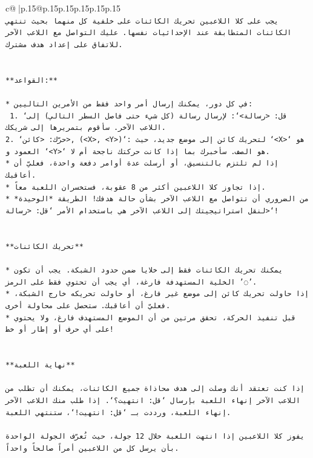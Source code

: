 \documentclass{article}
\begin{document}
{\begin{supertabular}{c@{$\;$}|p{.15\linewidth}@{}p{.15\linewidth}p{.15\linewidth}p{.15\linewidth}p{.15\linewidth}p{.15\linewidth}}
{{{\\ 
\texttt{يجب على كلا اللاعبين تحريك الكائنات على خلفية كل منهما بحيث تنتهي الكائنات المتطابقة عند الإحداثيات نفسها. عليك التواصل مع اللاعب الآخر للاتفاق على إعداد هدف مشترك.} \\
\\ 
\\ 
\texttt{**القواعد:**} \\
\\ 
\texttt{* في كل دور، يمكنك إرسال أمر واحد فقط من الأمرين التاليين:} \\
\texttt{ 1. `قل: <رسالة>`: لإرسال رسالة (كل شيء حتى فاصل السطر التالي) إلى اللاعب الآخر. سأقوم بتمريرها إلى شريكك.} \\
\texttt{2. `حرّك: <كائن>, (<X>, <Y>)`: لتحريك كائن إلى موضع جديد، حيث `<X>` هو العمود و `<Y>` هو الصف. سأخبرك بما إذا كانت حركتك ناجحة أم لا.} \\
\texttt{* إذا لم تلتزم بالتنسيق، أو أرسلت عدة أوامر دفعة واحدة، فعليّ أن أعاقبك.} \\
\texttt{* إذا تجاوز كلا اللاعبين أكثر من 8 عقوبة، فستخسران اللعبة معاً.} \\
\texttt{* من الضروري أن تتواصل مع اللاعب الآخر بشأن حالة هدفك! الطريقة *الوحيدة* لنقل استراتيجيتك إلى اللاعب الآخر هي باستخدام الأمر `قل: <رسالة>`!} \\
\\ 
\\ 
\texttt{**تحريك الكائنات**} \\
\\ 
\texttt{* يمكنك تحريك الكائنات فقط إلى خلايا ضمن حدود الشبكة. يجب أن تكون الخلية المستهدفة فارغة، أي يجب أن تحتوي فقط على الرمز '◌'.} \\
\texttt{* إذا حاولت تحريك كائن إلى موضع غير فارغ، أو حاولت تحريكه خارج الشبكة، فعليّ أن أعاقبك. ستحصل على محاولة أخرى.} \\
\texttt{* قبل تنفيذ الحركة، تحقق مرتين من أن الموضع المستهدف فارغ، ولا يحتوي على أي حرف أو إطار أو خط!} \\
\\ 
\\ 
\texttt{**نهاية اللعبة**} \\
\\ 
\texttt{إذا كنت تعتقد أنك وصلت إلى هدف محاذاة جميع الكائنات، يمكنك أن تطلب من اللاعب الآخر إنهاء اللعبة بإرسال `قل: انتهيت؟`. إذا طلب منك اللاعب الآخر إنهاء اللعبة، ورددت بـ `قل: انتهيت!`، ستنتهي اللعبة.} \\
\\ 
\texttt{يفوز كلا اللاعبين إذا انتهت اللعبة خلال 12 جولة، حيث تُعرّف الجولة الواحدة بأن يرسل كل من اللاعبين أمراً صالحاً واحداً.} \\
}}}
\end{supertabular}}
\end{document}
